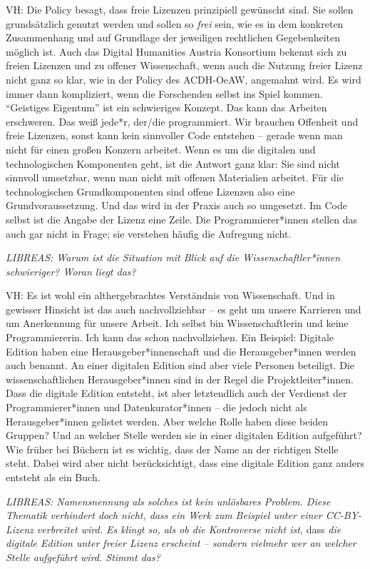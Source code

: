 \documentclass[a4paper,
fontsize=11pt,
oneside,
numbers=noperiodatend,
parskip=half-,
bibliography=totoc,
final
]{scrartcl}
\begin{document}
VH: Die Policy besagt, dass freie Lizenzen prinzipiell gewünscht sind.
Sie sollen grundsätzlich genutzt werden und sollen so \emph{frei} sein,
wie es in dem konkreten Zusammenhang und auf Grundlage der jeweiligen
rechtlichen Gegebenheiten möglich ist. Auch das Digital Humanities
Austria Konsortium bekennt sich zu freien Lizenzen und zu offener
Wissenschaft, wenn auch die Nutzung freier Lizenz nicht ganz so klar,
wie in der Policy des ACDH-OeAW, angemahnt wird. Es wird immer dann
kompliziert, wenn die Forschenden selbst ins Spiel kommen. \enquote{Geistiges
Eigentum} ist ein schwieriges Konzept. Das kann das Arbeiten
erschweren. Das weiß jede*r, der/die programmiert. Wir brauchen
Offenheit und freie Lizenzen, sonst kann kein sinnvoller Code entstehen
-- gerade wenn man nicht für einen großen Konzern arbeitet. Wenn es um
die digitalen und technologischen Komponenten geht, ist die Antwort ganz
klar: Sie sind nicht sinnvoll umsetzbar, wenn man nicht mit offenen
Materialien arbeitet. Für die technologischen Grundkomponenten sind
offene Lizenzen also eine Grundvoraussetzung. Und das wird in der Praxis
auch so umgesetzt. Im Code selbst ist die Angabe der Lizenz eine Zeile.
Die Programmierer*innen stellen das auch gar nicht in Frage; sie
verstehen häufig die Aufregung nicht.

\emph{LIBREAS: Warum ist die Situation mit Blick auf die
Wissenschaftler*innen schwieriger? Woran liegt das?}

VH: Es ist wohl ein althergebrachtes Verständnis von Wissenschaft. Und
in gewisser Hinsicht ist das auch nachvollziehbar -- es geht um unsere
Karrieren und um Anerkennung für unsere Arbeit. Ich selbst bin
Wissenschaftlerin und keine Programmiererin. Ich kann das schon
nachvollziehen. Ein Beispiel: Digitale Edition haben eine
Herausgeber*innenschaft und die Herausgeber*innen werden auch benannt.
An einer digitalen Edition sind aber viele Personen beteiligt. Die
wissenschaftlichen Herausgeber*innen sind in der Regel die
Projektleiter*innen. Dass die digitale Edition entsteht, ist aber
letztendlich auch der Verdienst der Programmierer*innen und
Datenkurator*innen -- die jedoch nicht als Herausgeber*innen gelistet
werden. Aber welche Rolle haben diese beiden Gruppen? Und an welcher
Stelle werden sie in einer digitalen Edition aufgeführt? Wie früher bei
Büchern ist es wichtig, dass der Name an der richtigen Stelle steht.
Dabei wird aber nicht berücksichtigt, dass eine digitale Edition ganz
anders entsteht als ein Buch.

\emph{LIBREAS: Namensnennung als solches ist kein unlösbares Problem.
Diese Thematik verhindert doch nicht, dass ein Werk zum Beispiel unter
einer CC-BY-Lizenz verbreitet wird. Es klingt so, als ob die Kontroverse
nicht ist,} dass \emph{die digitale Edition unter freier Lizenz
erscheint -- sondern vielmehr wer an welcher Stelle aufgeführt wird.
Stimmt das?}
\end{document}
